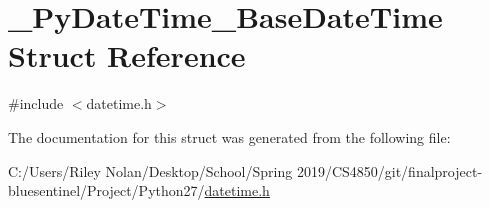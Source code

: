 \hypertarget{struct___py_date_time___base_date_time}{}\section{\+\_\+\+Py\+Date\+Time\+\_\+\+Base\+Date\+Time Struct Reference}
\label{struct___py_date_time___base_date_time}


{\ttfamily \#include $<$datetime.\+h$>$}



The documentation for this struct was generated from the following file\+:\begin{DoxyCompactItemize}
\item 
C\+:/\+Users/\+Riley Nolan/\+Desktop/\+School/\+Spring 2019/\+C\+S4850/git/finalproject-\/bluesentinel/\+Project/\+Python27/\mbox{\hyperlink{datetime_8h}{datetime.\+h}}\end{DoxyCompactItemize}
